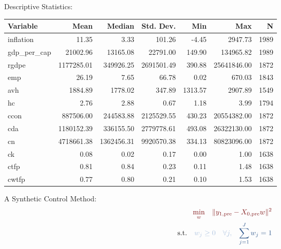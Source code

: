 \documentclass[11pt,aspectratio=169]{beamer}
\begin{document}
\begin{frame}{Descriptive Statistics:}    
  \begin{table}[H]
    \centering
    \small
    \begin{tabular}{l r r r r r r}
    \toprule
    \textbf{Variable} & \textbf{Mean} & \textbf{Median} & \textbf{Std. Dev.} & \textbf{Min} & \textbf{Max} & \textbf{N} \\
    \midrule
    inflation      & 11.35    & 3.33     & 101.26   & -4.45   & 2947.73   & 1989 \\
    gdp\_per\_cap  & 21002.96 & 13165.08 & 22791.00 & 149.90  & 134965.82 & 1989 \\
    rgdpe          & 1177285.01 & 349926.25 & 2691501.49 & 390.88 & 25641846.00 & 1872 \\
    emp            & 26.19    & 7.65     & 66.78    & 0.02    & 670.03    & 1843 \\
    avh            & 1884.89  & 1778.02  & 347.89   & 1313.57 & 2907.89   & 1549 \\
    hc             & 2.76     & 2.88     & 0.67     & 1.18    & 3.99      & 1794 \\
    ccon           & 887506.00 & 244583.88 & 2125529.55 & 430.23 & 20554382.00 & 1872 \\
    cda            & 1180152.39 & 336155.50 & 2779778.61 & 493.08 & 26322130.00 & 1872 \\
    cn             & 4718661.38 & 1362456.31 & 9920570.38 & 334.13 & 80823096.00 & 1872 \\
    ck             & 0.08     & 0.02     & 0.17     & 0.00    & 1.00      & 1638 \\
    ctfp           & 0.81     & 0.84     & 0.23     & 0.11    & 1.48      & 1638 \\
    cwtfp          & 0.77     & 0.80     & 0.21     & 0.10    & 1.53      & 1638 \\
    \bottomrule
    \end{tabular}
    \end{table}
\end{frame}

\begin{frame}{A Synthetic Control Method:}
  \begin{align*}
    {\color{primaryred}\min_{w}} \quad 
    {\color{primaryred}\| y_{1,\text{pre}} - X_{0,\text{pre}} w \|^2}
    \\
    \text{s.t.} \quad 
    {\color{steelblue}w_j \ge 0 \quad \forall j,}
    \quad 
    {\color{harmonizedblue}\sum_{j=1}^{J} w_j = 1}
  \end{align*}
\end{frame}
\end{document}
